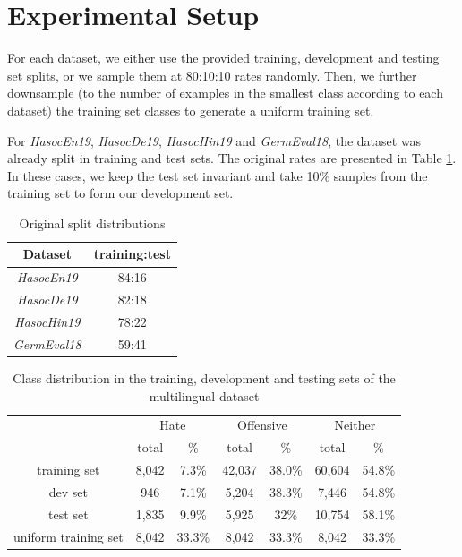 \documentclass[11pt]{article}
\begin{document}
	
	\section{Experimental Setup}
	
	For each dataset, we either use the provided training, development and testing set splits, or we sample them at 80:10:10 rates randomly. Then, we further downsample (to the number of examples in the smallest class according to each dataset) the training set classes to generate a uniform training set.
	
	For \textit{HasocEn19}, \textit{HasocDe19}, \textit{HasocHin19} and \textit{GermEval18}, the dataset was already split in training and test sets. The original rates are presented in Table \ref{original_rate}. In these cases, we keep the test set invariant and take 10\% samples from the training set to form our development set.
	
	\begin{table}[h]
		\centering
		\small
		\begin{tabular}{|c|c|}
			\hline Dataset & training:test \\ \hline
			\textit{HasocEn19} &  84:16 \\\hline
			\textit{HasocDe19}  & 82:18 \\\hline
			\textit{HasocHin19}  & 78:22 \\\hline
			\textit{GermEval18}  & 59:41 \\\hline
		\end{tabular}
		\caption{Original split distributions\label{original_rate}}
	\end{table}
	
	\begin{table}[t!]
		\centering
		\small
		\begin{tabular}{|c|c|c|c|c|c|c|}
			\hline \multirow{2}{*}{~}  & \multicolumn{2}{c|}{Hate} & \multicolumn{2}{c|}{Offensive} & \multicolumn{2}{c|}{Neither}\\\cline{2-7}
			~ & total & \% & total & \% & total & \% \\\hline
			training set & 8,042 & 7.3\% & 42,037 & 38.0\% & 60,604 & 54.8\%  \\\hline
			dev set & 946 & 7.1\% & 5,204 & 38.3\% & 7,446 & 54.8\% \\\hline
			test set & 1,835 & 9.9\% & 5,925 & 32\% & 10,754 & 58.1\% \\\hline
			uniform training set & 8,042 & 33.3\% & 8,042 & 33.3\% & 8,042 & 33.3\% \\\hline
		\end{tabular}
		\caption{Class distribution in the training, development and testing sets of the multilingual dataset\label{multi_distribution}}
	\end{table}
	
\end{document}
